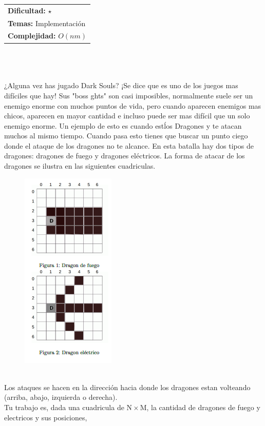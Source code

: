 \documentclass[12pt]{article}
\begin{document}
\hfill
\begin{tabular}{@{}l@{}}
\textbf{Dificultad:} $\star$\\
\textbf{Temas:} Implementación\\
\textbf{Complejidad:} $O(nm)$
\end{tabular}\\
\\
\\¿Alguna vez has jugado Dark Souls? ¡Se dice que es uno de los juegos mas dif\'iciles que hay! Sus "boss ghts" son
casi imposibles, normalmente suele ser un enemigo enorme con muchos puntos de vida, pero cuando aparecen
enemigos mas chicos, aparecen en mayor cantidad e incluso puede ser mas dif\'icil que un solo enemigo enorme. Un
ejemplo de esto es cuando est\' los Dragones y te atacan muchos al mismo tiempo. Cuando pasa esto
tienes que buscar un punto ciego donde el ataque de los dragones no te alcance. En esta batalla hay dos tipos de
dragones: dragones de fuego y dragones el\'ectricos. La forma de atacar de los dragones se ilustra en las siguientes
cuadriculas. \\
\begin{figure}[h!] 
\begin{center} 
\includegraphics[scale = 1.0]{i1.PNG}\hspace{50mm}  
\end{center} 
\end{figure}
\\Los ataques se hacen en la direcci\'on hacia donde los dragones estan volteando (arriba, abajo, izquierda o
derecha).
\\
Tu trabajo es, dada una cuadricula de $\mathrm{N \times M}$, la cantidad de dragones de fuego y electricos y sus posiciones,
\end{document}
